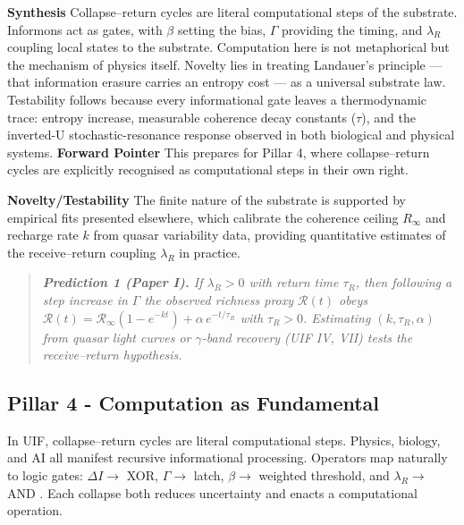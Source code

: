 \noindent \textbf{Synthesis}
\newline
Collapse–return cycles are literal computational steps of the substrate. Informons act as gates, with $\beta$ setting the bias, $\Gamma$ providing the timing, and $\lambda_R$ coupling local states to the substrate. Computation here is not metaphorical but the mechanism of physics itself. Novelty lies in treating Landauer’s principle — that information erasure carries an entropy cost — as a universal substrate law. Testability follows because every informational gate leaves a thermodynamic trace: entropy increase, measurable coherence decay constants ($\tau$), and the inverted-U stochastic-resonance response observed in both biological and physical systems.
\clearpage
\noindent
\textbf{Forward Pointer}
\newline This prepares for Pillar 4, where collapse–return cycles are explicitly recognised as computational steps in their own right.
\newline

\noindent
\textbf{Novelty/Testability} 
\newline The finite nature of the substrate is supported by empirical fits presented elsewhere, which calibrate the coherence ceiling $R_\infty$ and recharge rate $k$ from quasar variability data, providing quantitative estimates of the receive–return coupling $\lambda_R$ in practice.

\begin{quote}\itshape
\textbf{Prediction 1 (Paper I).} If $\lambda_R>0$ with return time $\tau_R$, then following a step increase in $\Gamma$ the observed richness proxy $\mathcal{R}(t)$ obeys
$\mathcal{R}(t)=\mathcal{R}_\infty\!\left(1-e^{-k t}\right)+\alpha\,e^{-t/\tau_R}$ with $\tau_R>0$.
Estimating $(k,\tau_R,\alpha)$ from quasar light curves or $\gamma$-band recovery (UIF IV, VII) tests the receive–return hypothesis.
\end{quote}


\subsection {Pillar 4 - Computation as Fundamental}

In UIF, collapse–return cycles are literal computational steps. Physics, biology, and AI all manifest recursive informational processing. Operators map naturally to logic gates: $\Delta I \rightarrow$ XOR, $\Gamma \rightarrow$ latch, $\beta \rightarrow$ weighted threshold, and $\lambda_R \rightarrow$ AND \cite{Shannon1948,Brillouin1962}. Each collapse both reduces uncertainty and enacts a computational operation.

